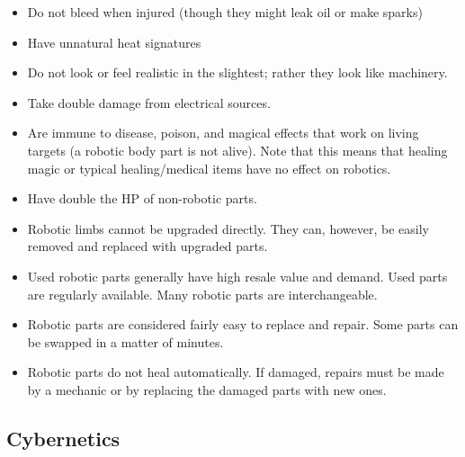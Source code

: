 \documentclass[twoside]{book}
\begin{document}
\begin{itemize}
      
  \item Do not bleed when injured (though they might leak oil or make sparks)
  \item Have unnatural heat signatures
  \item Do not look or feel realistic in the slightest; rather they look like machinery.
  \item Take double damage from electrical sources.
  \item Are immune to disease, poison, and magical effects that work on living targets (a robotic body part is not alive). Note that this means that healing magic or typical healing/medical items have no effect on robotics.
  \item Have double the HP of non-robotic parts.
  \item Robotic limbs cannot be upgraded directly. They can, however, be easily removed and replaced with upgraded parts.
  \item Used robotic parts generally have high resale value and demand. Used parts are regularly available. Many robotic parts are interchangeable.
  \item Robotic parts are considered fairly easy to replace and repair. Some parts can be swapped in a matter of minutes.
  \item Robotic parts do not heal automatically. If damaged, repairs must be made by a mechanic or by replacing the damaged parts with new ones.
\end{itemize}
  
    

\subsection{Cybernetics}
    
\end{document}
